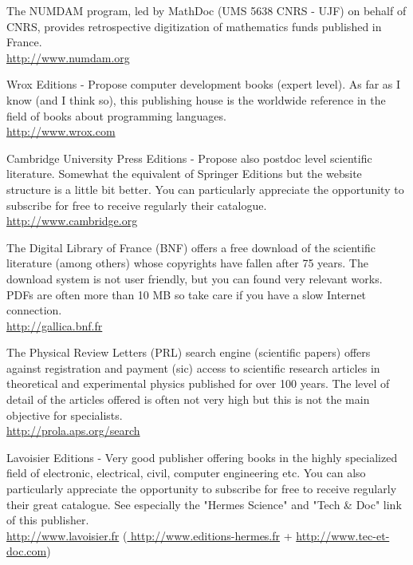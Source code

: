 	{\Large {}}{\Large {}}{\Large {}}\bcdfrance{} The NUMDAM program, led by MathDoc (UMS 5638 CNRS - UJF) on behalf of CNRS, provides retrospective digitization of mathematics funds published in France.\\
	\href{http://www.numdam.org}{\color{blue}http://www.numdam.org}
	
	{\Large {}}{\Large {}}{\Large {}}{\Large {}} Wrox Editions - Propose computer development books (expert level). As far as I know (and I think so), this publishing house is the worldwide reference in the field of books about programming languages.\\
	\href{http://www.wrox.com}{\color{blue}http://www.wrox.com}
	
	{\Large {}}{\Large {}}{\Large {}} Cambridge University Press Editions - Propose also postdoc level scientific literature. Somewhat the equivalent of Springer Editions but the website structure is a little bit better. You can particularly appreciate the opportunity to subscribe for free to receive regularly their catalogue.\\
	\href{http://www.cambridge.org}{\color{blue}http://www.cambridge.org}
	
	
	{\Large {}}{\Large {}}{\Large {}}{\Large {}}\bcdfrance{} The Digital Library of France (BNF) offers a free download of the scientific literature (among others) whose copyrights have fallen after 75 years. The download system is not user friendly, but you can found very relevant works. PDFs are often more than 10 MB so take care if you have a slow Internet connection.\\
	\href{http://gallica.bnf.fr}{\color{blue} http://gallica.bnf.fr}
	
	{\Large {}}{\Large {}}{\Large {}}{\Large {}} The Physical Review Letters (PRL) search engine (scientific papers) offers against registration and payment (sic) access to scientific research articles in theoretical and experimental physics published for over 100 years. The level of detail of the articles offered is often not very high but this is not the main objective for specialists.\\
	\href{http://prola.aps.org/search}{\color{blue} http://prola.aps.org/search}
	
	\pagebreak
	{\Large {}}{\Large {}}{\Large {}}\bcdfrance{} Lavoisier Editions - Very good publisher offering books in the highly specialized field of electronic, electrical, civil, computer engineering etc. You can also particularly appreciate the opportunity to subscribe for free to receive regularly their great catalogue. See especially the "Hermes Science" and "Tech \& Doc" link of this publisher.\\
	\href{http://www.lavoisier.fr}{\color{blue} http://www.lavoisier.fr} (\href{http://www.editions-hermes.fr}{\color{blue} http://www.editions-hermes.fr} + \href{http://www.tec-et-doc.com}{\color{blue} http://www.tec-et-doc.com})
	

